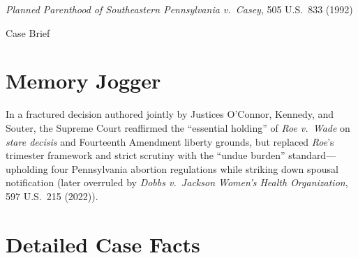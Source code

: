 \documentclass[12pt]{article}
\begin{document}
\begin{center}
{\LARGE \textit{Planned Parenthood of Southeastern Pennsylvania v.\ Casey}, 505 U.S.\ 833 (1992)\par}
\vspace{0.8em}
{\large Case Brief\par}
\end{center}
\vspace{1em}

\section{Memory Jogger}

In a fractured decision authored jointly by Justices O'Connor, Kennedy, and Souter, the Supreme Court reaffirmed the ``essential holding'' of \textit{Roe v.\ Wade} on \textit{stare decisis} and Fourteenth Amendment liberty grounds, but replaced \textit{Roe}'s trimester framework and strict scrutiny with the ``undue burden'' standard---upholding four Pennsylvania abortion regulations while striking down spousal notification (later overruled by \textit{Dobbs v.\ Jackson Women's Health Organization}, 597 U.S.\ 215 (2022)).

\section{Detailed Case Facts}
\end{document}
